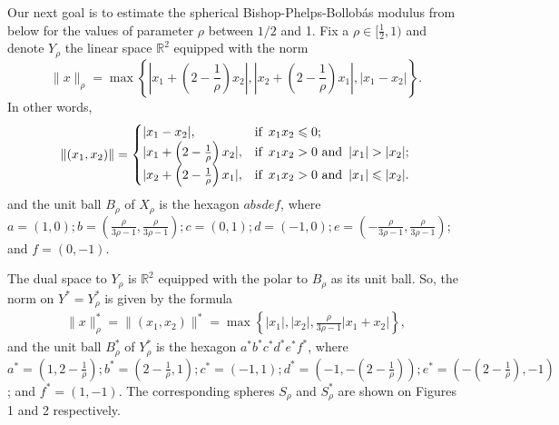 \documentclass[11pt,a4paper]{amsart}
\newcommand{\R}{{\mathbb{R}}}
\numberwithin{equation}{section}
\theoremstyle{plain}
\theoremstyle{definition}
\renewcommand{\leq}{\leqslant}
\begin{document}
Our next goal is to estimate the spherical Bishop-Phelps-Bollob\'{a}s modulus from below for the values of parameter $\rho$ between $1/2$ and 1. Fix a $\rho \in [\frac{1}{2},  1)$ and denote $Y_\rho$ the linear space $\R^2$ equipped with the norm 
\begin{equation}\label{eq_norm}
\|x\|_\rho= \max\left\lbrace | x_1  + \left(2-\frac{1}{\rho}\right) x_2| , | x_2 +  \left(2-\frac{1}{\rho}\right) x_1|, | x_1- x_2|\right\rbrace.
\end{equation}
In other words, 
$$\|(x_1,x_2)\| =\begin{cases}
| x_1- x_2|, &\text{if \,} x_1x_2\leq 0;\\
|  x_1  +  \left(2-\frac{1}{\rho}\right) x_2|,&\text{if \,} x_1x_2>0 \,\, \text{and \,} | x_1|>| x_2|;\\
| x_2 +   \left(2-\frac{1}{\rho}\right) x_1|,&\text{if \,}x_1x_2>0  \,\, \text{and \,}  | x_1|\leq | x_2|.
\end{cases}$$
and the unit ball $B_{\rho}$ of $X_\rho$ is the hexagon $absdef$, where 
$a = (1, 0); b = (\frac{\rho}{3\rho-1},\frac{\rho}{3\rho-1}); c = (0, 1); d = (-1, 0); e = (-\frac{\rho}{3\rho-1}, \frac{\rho}{3\rho-1})$; and $f = (0, - 1)$.

The dual space to $Y_\rho$ is $\R^2$ equipped with the polar to $B_{\rho}$ as its unit ball. So, the norm  on $Y^*=Y_\rho^*$ is given by the formula 
\begin{align*}
\|x\|_\rho^*=\|(x_1,x_2)\|^{*}=
\max\left\{| x_1|, | x_2|, \frac{\rho}{3\rho-1}| x_1 + x_2|\right\},
\end{align*}
and the unit ball $B_{\rho}^*$ of  $Y_\rho^*$ is the hexagon $a^*b^*c^*d^*e^*f^*$, where 
$a^* = (1, 2-\frac{1}{\rho}); b^* = \left(2-\frac{1}{\rho} , 1\right); c^* = (-1, 1); d^* = (-1, -\left(2-\frac{1}{\rho}\right)); e^* = (-\left(2-\frac{1}{\rho}\right), -1)$; and $f^* = (1, -1)$.
The corresponding spheres $S_{\rho}$ and $S_{\rho}^*$ are shown on Figures 1 and 2 respectively.
\\
\end{document}
